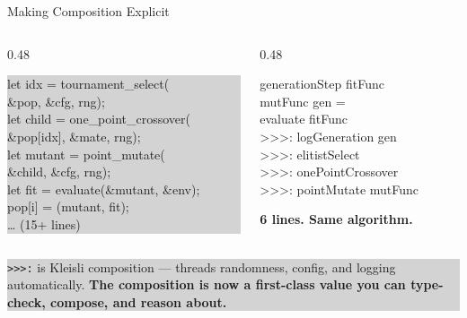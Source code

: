 \documentclass[aspectratio=169,12pt]{beamer}
\begin{document}
\begin{frame}{Making Composition Explicit}
\begin{columns}[T]
  \begin{column}{0.48\textwidth}
    \colorbox{lightgray}{\parbox{0.94\textwidth}{%
    \ttfamily\scriptsize\color{midgray}%
    let idx = tournament\_select(\\
    \hspace{1em}\&pop, \&cfg, rng);\\
    let child = one\_point\_crossover(\\
    \hspace{1em}\&pop[idx], \&mate, rng);\\
    let mutant = point\_mutate(\\
    \hspace{1em}\&child, \&cfg, rng);\\
    let fit = evaluate(\&mutant, \&env);\\
    pop[i] = (mutant, fit);\\
    \ldots{} \textcolor{midgray}{(15+ lines)}
    }}
  \end{column}
  \begin{column}{0.48\textwidth}
    \vspace{0.6em}
    \colorbox{white!90!accentblue}{\parbox{0.94\textwidth}{%
    \ttfamily\small\color{deepblue}%
    generationStep fitFunc\\
    \hspace{2em}mutFunc gen =\\
    \hspace{1em}evaluate fitFunc\\
    \hspace{2em}>>>: logGeneration gen\\
    \hspace{2em}>>>: elitistSelect\\
    \hspace{2em}>>>: onePointCrossover\\
    \hspace{2em}>>>: pointMutate mutFunc
    }}
    \vspace{0.5em}
    \begin{center}
      \Large\bfseries\color{accentorange}6 lines. Same algorithm.
    \end{center}
  \end{column}
\end{columns}
\vspace{0.5em}
\begin{center}
  \colorbox{lightgray}{\parbox{0.88\textwidth}{\centering
    \small\color{deepblue}
    \texttt{>>>:} is Kleisli composition --- threads randomness, config, and logging automatically.
    \textbf{The composition is now a first-class value you can type-check, compose, and reason about.}
  }}
\end{center}
\end{frame}
\end{document}
